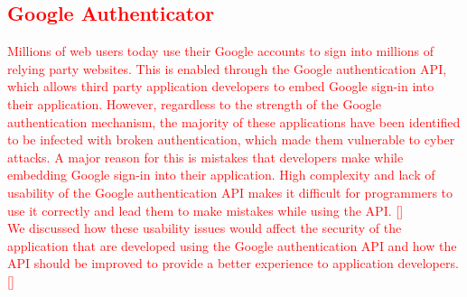 	\textcolor{red}{
	\subsection{Google Authenticator}
	Millions of web users today use their Google accounts to sign into millions of relying party websites. This is enabled through the Google authentication API, which allows third party application developers to embed Google sign-in into their application. However, regardless to the strength of the Google authentication mechanism, the majority of these applications have been identified to be infected with broken authentication, which made them vulnerable to cyber attacks. A major reason for this is mistakes that developers make while embedding Google sign-in into their application. High complexity and lack of usability of the Google authentication API makes it difficult for programmers to use it correctly and lead them to make mistakes while using the API. [\cite{wijayarathna2019empirical}]
	\\
	We discussed how these usability issues would affect the security of the application that are developed using the Google authentication API and how the API should be improved to provide a better experience to application developers. [\cite{wijayarathna2019empirical}]}